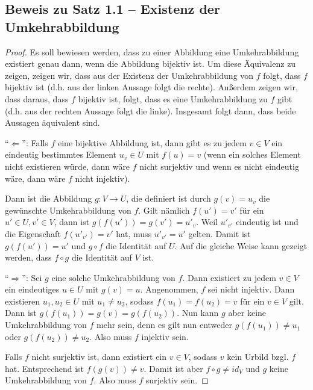 \documentclass[../../main.tex]{subfiles}
\begin{document}
\subsection*{Beweis zu Satz 1.1 -- Existenz der Umkehrabbildung}
\begin{proof}
    \label{proof:existenceOfInverseMap}
    Es soll bewiesen werden, dass zu einer Abbildung eine Umkehrabbildung existiert genau dann, wenn die Abbildung bijektiv ist. Um diese Äquivalenz zu zeigen, zeigen wir, dass aus der Existenz der Umkehrabbildung von $f$ folgt, dass $f$ bijektiv ist (d.h. aus der linken Aussage folgt die rechte). Außerdem zeigen wir, dass daraus, dass $f$ bijektiv ist, folgt, dass es eine Umkehrabbildung zu $f$ gibt (d.h. aus der rechten Aussage folgt die linke). Insgesamt folgt dann, dass beide Aussagen äquivalent sind.
    
    \enquote{$\Leftarrow$}:
    Falls $f$ eine bijektive Abbildung ist, dann gibt es zu jedem $v\in V$ ein eindeutig bestimmtes Element $u_v\in U$ mit $f(u)=v$ (wenn ein solches Element nicht existieren würde, dann wäre $f$ nicht surjektiv und wenn es nicht eindeutig wäre, dann wäre $f$ nicht injektiv). 
    
    Dann ist die Abbildung $g\colon V\rightarrow U$, die definiert ist durch $g(v)=u_v$ die gewünschte Umkehrabbildung von $f$. Gilt nämlich $f(u')=v'$ für ein $u'\in U,v'\in V$, dann ist $g(f(u'))=g(v')=u'_v$. Weil $u'_{v'}$ eindeutig ist und die Eigenschaft $f(u'_{v'})=v'$ hat, muss $u'_{v'}=u'$ gelten. Damit ist $g(f(u'))=u'$ und $g\circ f$ die Identität auf $U$. Auf die gleiche Weise kann gezeigt werden, dass $f\circ g$ die Identität auf $V$ ist.
    
    \enquote{$\Rightarrow$}:
    Sei $g$ eine solche Umkehrabbildung von $f$. Dann existiert zu jedem $v\in V$ ein eindeutiges $u\in U$ mit $g(v)=u$. Angenommen, $f$ sei nicht injektiv. Dann existieren $u_1,u_2\in U$ mit $u_1\neq u_2$, sodass $f(u_1)=f(u_2)=v$ für ein $v\in V$ gilt. Dann ist $g(f(u_1))=g(v)=g(f(u_2))$. Nun kann $g$ aber keine Umkehrabbildung von $f$ mehr sein, denn es gilt nun entweder $g(f(u_1))\neq u_1$ oder $g(f(u_2))\neq u_2$. Also muss $f$ injektiv sein.
    
    Falls $f$ nicht surjektiv ist, dann existiert ein $v\in V$, sodass $v$ kein Urbild bzgl. $f$ hat. Entsprechend ist $f(g(v))\neq v$. Damit ist aber $f\circ g\neq id_V$ und $g$ keine Umkehrabbildung von $f$. Also muss $f$ surjektiv sein.
\end{proof}

\newpage
\pagecolor{white}
\end{document}
